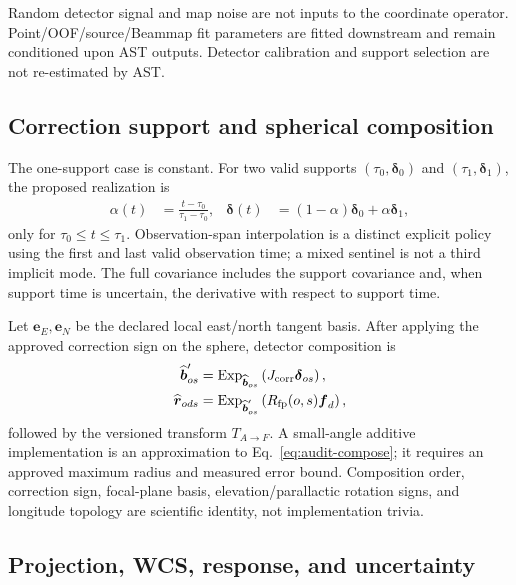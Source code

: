 \documentclass[11pt]{article}
\begin{document}
Random detector signal and map noise are not inputs to the coordinate operator.
Point/OOF/source/Beammap fit parameters are fitted downstream and remain
conditioned upon AST outputs.  Detector calibration and support selection are
not re-estimated by AST.

\subsection{Correction support and spherical composition}

The one-support case is constant.  For two valid supports
$(\tau_0,\boldsymbol\delta_0)$ and
$(\tau_1,\boldsymbol\delta_1)$, the proposed realization is
\begin{align}
 \alpha(t)&=\frac{t-\tau_0}{\tau_1-\tau_0}, &
 \boldsymbol\delta(t)&=(1-\alpha)\boldsymbol\delta_0+
                         \alpha\boldsymbol\delta_1,
 \label{eq:audit-interp}
\end{align}
only for $\tau_0\le t\le\tau_1$.  Observation-span interpolation is a distinct
explicit policy using the first and last valid observation time; a mixed
sentinel is not a third implicit mode.  The full covariance includes the
support covariance and, when support time is uncertain, the derivative with
respect to support time.

Let $\boldsymbol e_E,\boldsymbol e_N$ be the declared local east/north tangent
basis.  After applying the approved correction sign on the sphere, detector
composition is
\begin{align}
 \widehat{\boldsymbol b}'_{os}
  &=\operatorname{Exp}_{\widehat{\boldsymbol b}_{os}}
       \left(J_{\rm corr}\boldsymbol\delta_{os}\right),\\
 \widehat{\boldsymbol r}_{ods}
  &=\operatorname{Exp}_{\widehat{\boldsymbol b}'_{os}}
       \left(R_{\rm fp}(o,s)\boldsymbol f_d\right),
 \label{eq:audit-compose}
\end{align}
followed by the versioned transform $T_{A\to F}$.  A small-angle additive
implementation is an approximation to Eq.~\eqref{eq:audit-compose}; it requires
an approved maximum radius and measured error bound.  Composition order,
correction sign, focal-plane basis, elevation/parallactic rotation signs, and
longitude topology are scientific identity, not implementation trivia.

\subsection{Projection, WCS, response, and uncertainty}
\end{document}
